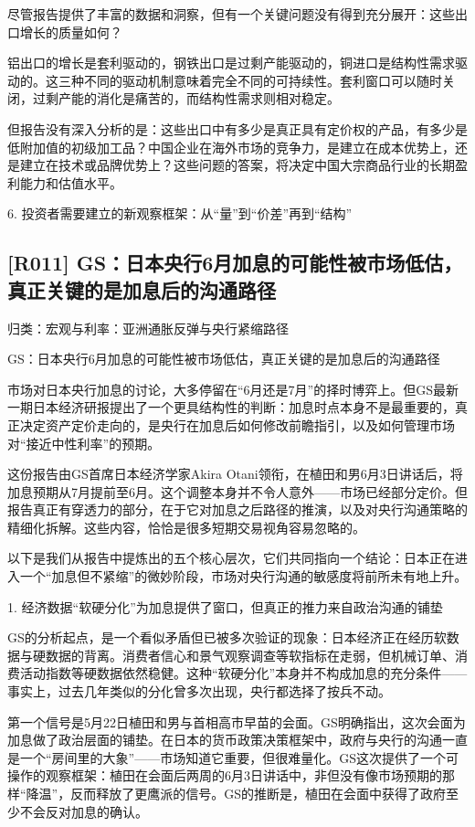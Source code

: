 \documentclass[11pt]{ctexart}
\begin{document}
尽管报告提供了丰富的数据和洞察，但有一个关键问题没有得到充分展开：这些出口增长的质量如何？

铝出口的增长是套利驱动的，钢铁出口是过剩产能驱动的，铜进口是结构性需求驱动的。这三种不同的驱动机制意味着完全不同的可持续性。套利窗口可以随时关闭，过剩产能的消化是痛苦的，而结构性需求则相对稳定。

但报告没有深入分析的是：这些出口中有多少是真正具有定价权的产品，有多少是低附加值的初级加工品？中国企业在海外市场的竞争力，是建立在成本优势上，还是建立在技术或品牌优势上？这些问题的答案，将决定中国大宗商品行业的长期盈利能力和估值水平。

6. 投资者需要建立的新观察框架：从“量”到“价差”再到“结构”

\subsection{[R011] GS：日本央行6月加息的可能性被市场低估，真正关键的是加息后的沟通路径}
{\small\color{refgray}归类：宏观与利率：亚洲通胀反弹与央行紧缩路径}

GS：日本央行6月加息的可能性被市场低估，真正关键的是加息后的沟通路径

市场对日本央行加息的讨论，大多停留在“6月还是7月”的择时博弈上。但GS最新一期日本经济研报提出了一个更具结构性的判断：加息时点本身不是最重要的，真正决定资产定价走向的，是央行在加息后如何修改前瞻指引，以及如何管理市场对“接近中性利率”的预期。

这份报告由GS首席日本经济学家Akira Otani领衔，在植田和男6月3日讲话后，将加息预期从7月提前至6月。这个调整本身并不令人意外——市场已经部分定价。但报告真正有穿透力的部分，在于它对加息之后路径的推演，以及对央行沟通策略的精细化拆解。这些内容，恰恰是很多短期交易视角容易忽略的。

以下是我们从报告中提炼出的五个核心层次，它们共同指向一个结论：日本正在进入一个“加息但不紧缩”的微妙阶段，市场对央行沟通的敏感度将前所未有地上升。

1. 经济数据“软硬分化”为加息提供了窗口，但真正的推力来自政治沟通的铺垫

GS的分析起点，是一个看似矛盾但已被多次验证的现象：日本经济正在经历软数据与硬数据的背离。消费者信心和景气观察调查等软指标在走弱，但机械订单、消费活动指数等硬数据依然稳健。这种“软硬分化”本身并不构成加息的充分条件——事实上，过去几年类似的分化曾多次出现，央行都选择了按兵不动。

第一个信号是5月22日植田和男与首相高市早苗的会面。GS明确指出，这次会面为加息做了政治层面的铺垫。在日本的货币政策决策框架中，政府与央行的沟通一直是一个“房间里的大象”——市场知道它重要，但很难量化。GS这次提供了一个可操作的观察框架：植田在会面后两周的6月3日讲话中，非但没有像市场预期的那样“降温”，反而释放了更鹰派的信号。GS的推断是，植田在会面中获得了政府至少不会反对加息的确认。
\end{document}
